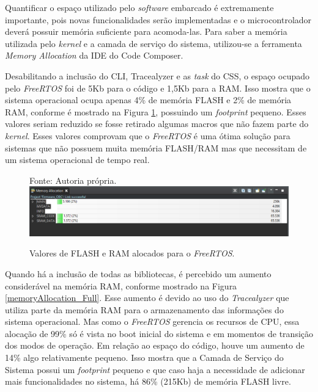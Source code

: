 Quantificar o espaço utilizado pelo \textit{software} embarcado é extremamente importante, pois novas funcionalidades serão implementadas e o microcontrolador deverá possuir memória suficiente para acomoda-las. Para saber a memória utilizada pelo \textit{kernel} e a camada de serviço do sistema, utilizou-se a ferramenta \textit{Memory Allocation} da IDE do Code Composer. 

Desabilitando a inclusão do CLI, Tracealyzer e as \textit{task} do CSS, o espaço ocupado pelo \textit{FreeRTOS} foi de 5Kb para o código e 1,5Kb para a RAM. Isso mostra que o sistema operacional ocupa apenas 4\% de memória FLASH e 2\% de memória RAM, conforme é mostrado na Figura \ref{memoryAllocation_RTOS}, possuindo um \textit{footprint} pequeno. Esses valores seriam reduzido se fosse retirado algumas macros que não fazem parte do \textit{kernel}. Esses valores comprovam que o \textit{FreeRTOS} é uma ótima solução para sistemas que não possuem muita memória FLASH/RAM mas que necessitam de um sistema operacional de tempo real. 

\begin{figure}[h]
\footnotesize{	
	\centering
			\centering
	\footnotesize{Fonte: Autoria própria.}
	\includegraphics[keepaspectratio=true,scale=0.6]{figuras/memoryAllocation_RTOS.PNG}
	\caption{Valores de FLASH e RAM alocados para o \textit{FreeRTOS}.}	
	\label{memoryAllocation_RTOS}
}
\end{figure}
\FloatBarrier

Quando há a inclusão de todas as bibliotecas, é percebido um aumento considerável na memória RAM, conforme mostrado na Figura \ref{memoryAllocation_Full}. Esse aumento é devido ao uso do \textit{Tracealyzer} que utiliza parte da memória RAM para o armazenamento das informações do sistema operacional. Mas como o \textit{FreeRTOS} gerencia os recursos de CPU, essa alocação de 99\% só é vista no boot inicial do sistema e em momentos de transição dos modos de operação. Em relação ao espaço do código, houve um aumento de 14\% algo relativamente pequeno. Isso mostra que a Camada de Serviço do Sistema possui um \textit{footprint} pequeno e que caso haja a necessidade de adicionar mais funcionalidades no sistema, há 86\% (215Kb) de memória FLASH livre. 


